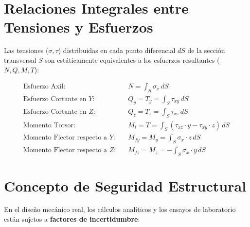 \section{Relaciones Integrales entre Tensiones y Esfuerzos}



Las tensiones ($\sigma, \tau$) distribuidas en cada punto diferencial $dS$ de la sección transversal $S$ son estáticamente equivalentes a los esfuerzos resultantes ($N, Q, M, T$):



\begin{align}

    \text{Esfuerzo Axil:}                  & \quad N = \int_S \sigma_x \, dS \label{eq:int_axil}                                      \\[6pt]

    \text{Esfuerzo Cortante en $Y$:}       & \quad Q_y = T_y = \int_S \tau_{xy} \, dS \label{eq:int_qy}                               \\[6pt]

    \text{Esfuerzo Cortante en $Z$:}       & \quad Q_z = T_z = \int_S \tau_{xz} \, dS \label{eq:int_qz}                               \\[6pt]

    \text{Momento Torsor:}                 & \quad M_t = T = \int_S (\tau_{xz}\cdot y - \tau_{xy}\cdot z) \, dS \label{eq:int_torsor} \\[6pt]

    \text{Momento Flector respecto a $Y$:} & \quad M_{fy} = M_y = \int_S \sigma_x \cdot z \, dS \label{eq:int_my}                     \\[6pt]

    \text{Momento Flector respecto a $Z$:} & \quad M_{fz} = M_z = -\int_S \sigma_x \cdot y \, dS \label{eq:int_mz}

\end{align}




\section{Concepto de Seguridad Estructural}



En el diseño mecánico real, los cálculos analíticos y los ensayos de laboratorio están sujetos a \textbf{factores de incertidumbre}:

